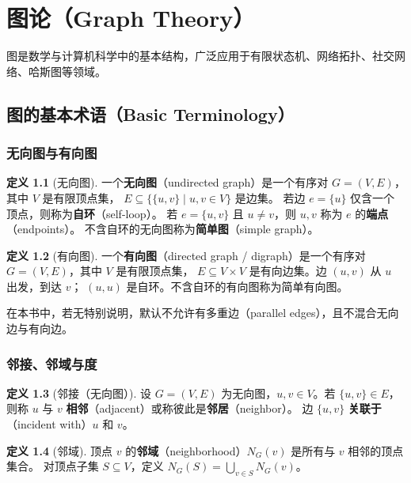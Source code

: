 \documentclass[UTF8,11pt,a4paper]{ctexbook}   %
\theoremstyle{definition}
\newtheorem{definition}{定义}[section]
\begin{document}
\chapter{图论（Graph Theory）}

图是数学与计算机科学中的基本结构，广泛应用于有限状态机、网络拓扑、社交网络、哈斯图等领域。

\section{图的基本术语（Basic Terminology）}

\subsection{无向图与有向图}

\begin{definition}[无向图]
一个\textbf{无向图}（undirected graph）是一个有序对 $G=(V,E)$，其中 $V$ 是有限顶点集，
$E \subseteq \{ \{u,v\} \mid u,v \in V \}$ 是边集。
若边 $e = \{u\}$ 仅含一个顶点，则称为\textbf{自环}（self-loop）。
若 $e = \{u,v\}$ 且 $u \neq v$，则 $u,v$ 称为 $e$ 的\textbf{端点}（endpoints）。
不含自环的无向图称为\textbf{简单图}（simple graph）。
\end{definition}

\begin{definition}[有向图]
一个\textbf{有向图}（directed graph / digraph）是一个有序对 $G=(V,E)$，其中 $V$ 是有限顶点集，
$E \subseteq V \times V$ 是有向边集。边 $(u,v)$ 从 $u$ 出发，到达 $v$；
$(u,u)$ 是自环。不含自环的有向图称为简单有向图。
\end{definition}

在本书中，若无特别说明，默认不允许有多重边（parallel edges），且不混合无向边与有向边。

\subsection{邻接、邻域与度}

\begin{definition}[邻接（无向图）]
设 $G=(V,E)$ 为无向图，$u,v \in V$。若 $\{u,v\} \in E$，则称 $u$ 与 $v$ \textbf{相邻}（adjacent）或称彼此是\textbf{邻居}（neighbor）。
边 $\{u,v\}$ \textbf{关联于}（incident with）$u$ 和 $v$。
\end{definition}

\begin{definition}[邻域]
顶点 $v$ 的\textbf{邻域}（neighborhood）$N_G(v)$ 是所有与 $v$ 相邻的顶点集合。
对顶点子集 $S \subseteq V$，定义 $N_G(S) = \bigcup_{v \in S} N_G(v)$。
\end{definition}
\end{document}
